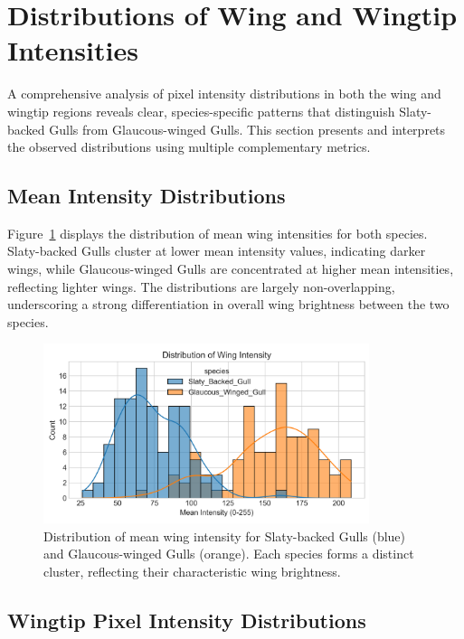 \documentclass[a4paper,12pt]{report}
\begin{document}
\section{Distributions of Wing and Wingtip Intensities}

A comprehensive analysis of pixel intensity distributions in both the wing and wingtip regions reveals clear, species-specific patterns that distinguish Slaty-backed Gulls from Glaucous-winged Gulls. This section presents and interprets the observed distributions using multiple complementary metrics.

\subsection{Mean Intensity Distributions}

Figure~\ref{fig:wing_intensity_distribution} displays the distribution of mean wing intensities for both species. Slaty-backed Gulls cluster at lower mean intensity values, indicating darker wings, while Glaucous-winged Gulls are concentrated at higher mean intensities, reflecting lighter wings. The distributions are largely non-overlapping, underscoring a strong differentiation in overall wing brightness between the two species.

\begin{figure}[h]
    \centering
    \includegraphics[width=0.85\textwidth]{images/REPORT_IMAGES_INTENSITY/I2/ditribution.png}
    \caption{Distribution of mean wing intensity for Slaty-backed Gulls (blue) and Glaucous-winged Gulls (orange). Each species forms a distinct cluster, reflecting their characteristic wing brightness.}
    \label{fig:wing_intensity_distribution}
\end{figure}


\subsection{Wingtip Pixel Intensity Distributions}
\end{document}

